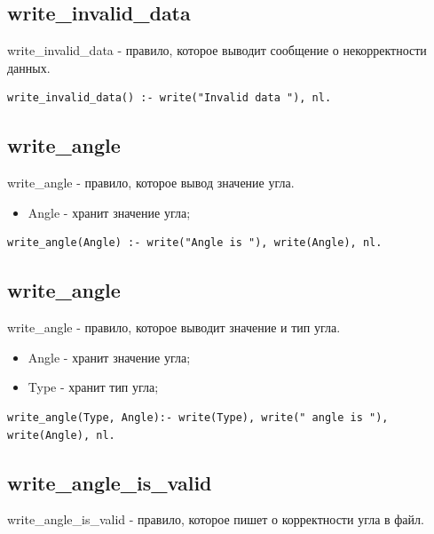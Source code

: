 \subsection{write\_invalid\_data}
\hspace{0.6cm} write\_invalid\_data - правило, которое выводит сообщение о некорректности данных.

\begin{lstlisting}[caption=Реализация правила write\_invalid\_data, label=rules:writeinvaliddata]
write_invalid_data() :- write("Invalid data "), nl.
\end{lstlisting}

\subsection{write\_angle}
\hspace{0.6cm} write\_angle - правило, которое вывод значение угла.

\begin{itemize}
	\item Angle - хранит значение угла;
\end{itemize}

\begin{lstlisting}[caption=Реализация правила write\_angle, label=rules:writeangle]
write_angle(Angle) :- write("Angle is "), write(Angle), nl.
\end{lstlisting}

\subsection{write\_angle}
\hspace{0.6cm} write\_angle - правило, которое выводит значение и тип угла.

\begin{itemize}
	\item Angle - хранит значение угла;
	\item Type - хранит тип угла;
\end{itemize}

\begin{lstlisting}[caption=Реализация правила write\_angle, label=rules:writeangle]
write_angle(Type, Angle):- write(Type), write(" angle is "), write(Angle), nl.
\end{lstlisting}

\subsection{write\_angle\_is\_valid}
\hspace{0.6cm} write\_angle\_is\_valid - правило, которое пишет о корректности угла в файл.

